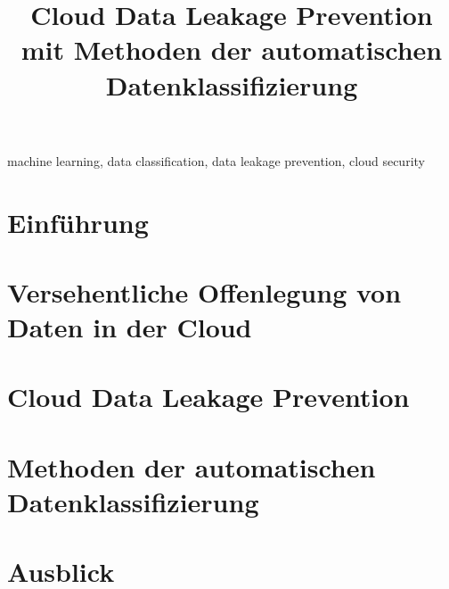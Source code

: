 \documentclass[conference]{IEEEtran}
\begin{document}
\title{Cloud Data Leakage Prevention mit Methoden der automatischen Datenklassifizierung}

\author{
}

\maketitle

\begin{abstract}
    
\end{abstract}

\begin{IEEEkeywords}
    machine learning, data classification, data leakage prevention, cloud security
\end{IEEEkeywords}

\section{Einführung}


\section{Versehentliche Offenlegung von Daten in der Cloud} \label{threat-kapitel}


\section{Cloud Data Leakage Prevention} \label{dlp-kapitel}


\section{Methoden der automatischen Datenklassifizierung}


\section{Ausblick}




\end{document}
